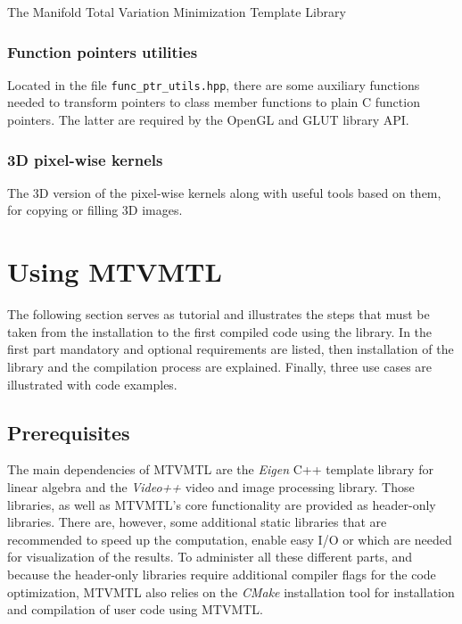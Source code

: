 \begin{chapter}{The Manifold Total Variation Minimization Template Library}

\subsubsection{Function pointers utilities} %
\label{ssub:Function pointers}
Located in the file \texttt{func\_ptr\_utils.hpp}, there are some auxiliary functions needed to transform pointers to class member functions
to plain C function pointers. The latter are required by the OpenGL and GLUT library API.

\subsubsection{3D pixel-wise kernels} %
\label{ssub:3D pixel-wise kernels}
The 3D version of the pixel-wise kernels along with useful tools based on them, for copying or filling 3D images.



\section{Using MTVMTL} %
\label{sec:Using TVTML}
The following section serves as tutorial and illustrates the steps that must be taken
from the installation to the first compiled code using the library. In the first part
mandatory and optional requirements are listed, then installation of the library and
the compilation process are explained. Finally, three use cases are illustrated with
code examples.

\subsection{Prerequisites} %
\label{sub:Prerequisites}
The main dependencies of MTVMTL are the \textit{Eigen} C++ template library for linear algebra and the \textit{Video++} video and image processing library. 
Those libraries, as well as MTVMTL's core functionality are provided as header-only libraries. There are, however, some additional static libraries
that are recommended to speed up the computation, enable easy I/O or which are needed for visualization of the results.
To administer all these different parts, and because the header-only libraries require additional compiler flags for the code optimization, MTVMTL also relies
on the \textit{CMake} installation tool for installation and compilation of user code using MTVMTL. \\


\end{chapter}
